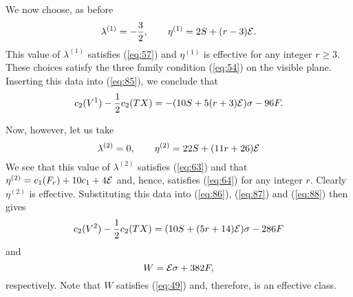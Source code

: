 \documentclass[a4paper,12pt]{article}
\numberwithin{equation}{section}
\theoremstyle{plain}
\begin{document}
We now choose, as before
%
\begin{equation}
\lambda^{(1)}=-\frac{3}{2}, \qquad \eta^{(1)}=2S+(r-3){\cal{E}}.
\label{eq:102}
\end{equation}
%
This value of $\lambda^{(1)}$ satisfies (\ref{eq:57}) and $\eta^{(1)}$ is
effective for any integer $r\geq3$. These choices satisfy the three family
condition (\ref{eq:54}) on the visible plane. Inserting this data into
(\ref{eq:85}), we conclude that
%
\begin{equation}
c_{2}(V^{1})-\frac{1}{2}c_{2}(TX)=-(10S+5(r+3){\cal{E}})\sigma-96F.
\label{eq:103}
\end{equation}
%


Now, however, let us take
%
\begin{equation}
\lambda^{(2)}=0, \qquad \eta^{(2)}=22S+(11r+26){\cal{E}}
\label{eq:104}
\end{equation}
%
We see that this value of $\lambda^{(2)}$ satisfies (\ref{eq:63}) and that
$\eta^{(2)}=c_{1}(F_{r})+10c_{1}+4{\cal{E}}$ and, hence, satisfies
(\ref{eq:64}) for any integer $r$. Clearly $\eta^{(2)}$ is effective.
Substituting this data into (\ref{eq:86}), (\ref{eq:87}) and (\ref{eq:88}) 
then gives
%
\begin{equation}
c_{2}(V^{2})-\frac{1}{2}c_{2}(TX)=(10S+(5r+14){\cal{E}})\sigma-286F
\label{eq:105}
\end{equation}
%
and
%
\begin{equation}
W={\cal{E}}\sigma+382F,
\label{eq:106}
\end{equation}
%
respectively. Note that $W$ satisfies (\ref{eq:49}) and, therefore, is an
effective class.
\end{document}
